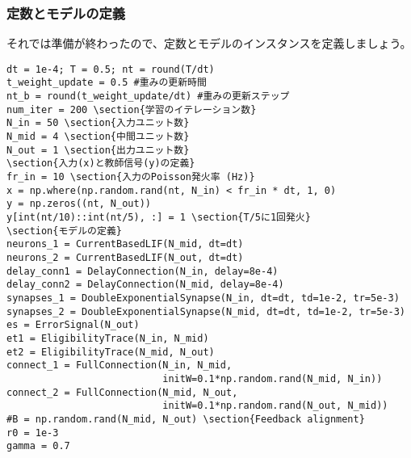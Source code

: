 \subsubsection{定数とモデルの定義}
それでは準備が終わったので、定数とモデルのインスタンスを定義しましょう。
\begin{verbatim}
dt = 1e-4; T = 0.5; nt = round(T/dt)
t_weight_update = 0.5 #重みの更新時間
nt_b = round(t_weight_update/dt) #重みの更新ステップ
num_iter = 200 \section{学習のイテレーション数}
N_in = 50 \section{入力ユニット数}
N_mid = 4 \section{中間ユニット数}
N_out = 1 \section{出力ユニット数}
\section{入力(x)と教師信号(y)の定義}
fr_in = 10 \section{入力のPoisson発火率 (Hz)}
x = np.where(np.random.rand(nt, N_in) < fr_in * dt, 1, 0)
y = np.zeros((nt, N_out)) 
y[int(nt/10)::int(nt/5), :] = 1 \section{T/5に1回発火}
\section{モデルの定義}
neurons_1 = CurrentBasedLIF(N_mid, dt=dt)
neurons_2 = CurrentBasedLIF(N_out, dt=dt)
delay_conn1 = DelayConnection(N_in, delay=8e-4)
delay_conn2 = DelayConnection(N_mid, delay=8e-4)
synapses_1 = DoubleExponentialSynapse(N_in, dt=dt, td=1e-2, tr=5e-3)
synapses_2 = DoubleExponentialSynapse(N_mid, dt=dt, td=1e-2, tr=5e-3)
es = ErrorSignal(N_out)
et1 = EligibilityTrace(N_in, N_mid)
et2 = EligibilityTrace(N_mid, N_out)
connect_1 = FullConnection(N_in, N_mid, 
                           initW=0.1*np.random.rand(N_mid, N_in))
connect_2 = FullConnection(N_mid, N_out, 
                           initW=0.1*np.random.rand(N_out, N_mid))
#B = np.random.rand(N_mid, N_out) \section{Feedback alignment}
r0 = 1e-3
gamma = 0.7

\end{verbatim}
